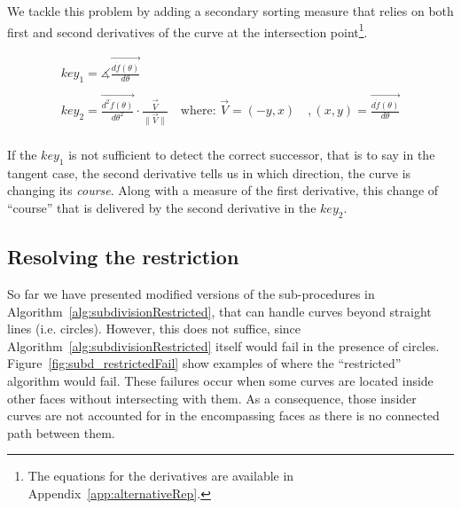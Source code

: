 We tackle this problem by adding a secondary sorting measure that relies on both first and second derivatives of the curve at the intersection point\footnote{The equations for the derivatives are available in Appendix~\ref{app:alternativeRep}.}.

\[
\begin{array}{l}
  key_1 = \measuredangle \overrightarrow{\frac{d\dot{f}(\theta)}{d\theta}}\\
  \quad\\
  key_2 = \overrightarrow{\frac{d^2\dot{f}(\theta)}{d\theta^2}} \cdot \frac{\overrightarrow{V}}{\|\overrightarrow{V}\|} \quad \text{where: } \overrightarrow{V} = (-y,x) \quad , (x,y) = \overrightarrow{\frac{d\dot{f}(\theta)}{d\theta}}\\
\end{array}
\]

If the $key_1$ is not sufficient to detect the correct successor, that is to say in the tangent case,
the second derivative tells us in which direction, the curve is changing its \emph{course}.
Along with a measure of the first derivative, this change of ``course'' that is delivered by the second derivative in the $key_2$.

\subsection{Resolving the restriction} \label{subsec:}

So far we have presented modified versions of the sub-procedures in Algorithm~\ref{alg:subdivisionRestricted}, that can handle curves beyond straight lines (i.e. circles).
However, this does not suffice, since Algorithm~\ref{alg:subdivisionRestricted} itself would fail in the presence of circles.
Figure~\ref{fig:subd_restrictedFail} show examples of where the ``restricted'' algorithm would fail.
These failures occur when some curves are located inside other faces without intersecting with them.
As a consequence, those insider curves are not accounted for in the encompassing faces as there is no connected path between them.

